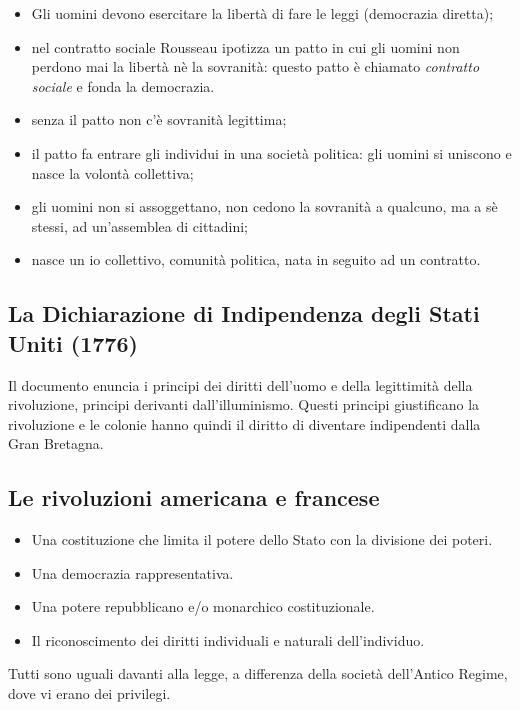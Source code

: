 \documentclass[a4paper]{article}
\begin{document}
\begin{itemize}
    \item Gli uomini devono esercitare la libertà di fare le leggi (democrazia diretta);
    \item nel contratto sociale Rousseau ipotizza un patto in cui gli uomini non perdono mai la libertà nè la sovranità: questo patto è chiamato \textit{contratto sociale} e fonda la democrazia.
    \item senza il patto non c'è sovranità legittima;
    \item il patto fa entrare gli individui in una società politica: gli uomini si uniscono e nasce la volontà collettiva;
    \item gli uomini non si assoggettano, non cedono la sovranità a qualcuno, ma a sè stessi, ad un'assemblea di cittadini;
    \item nasce un io collettivo, comunità politica, nata in seguito ad un contratto.
\end{itemize}

\subsection{La Dichiarazione di Indipendenza degli Stati Uniti (1776)}

Il documento enuncia i principi dei diritti dell'uomo e della legittimità della rivoluzione,
principi derivanti dall'illuminismo.
Questi principi giustificano la rivoluzione e le colonie hanno quindi il diritto di
diventare indipendenti dalla Gran Bretagna.


\subsection{Le rivoluzioni americana e francese}

\begin{itemize}
    \item Una costituzione che limita il potere dello Stato con la divisione dei poteri.
    \item Una democrazia rappresentativa.
    \item Una potere repubblicano e/o monarchico costituzionale.
    \item Il riconoscimento dei diritti individuali e naturali dell'individuo.
\end{itemize}

Tutti sono uguali davanti alla legge, a differenza della società dell'Antico Regime,
dove vi erano dei privilegi.
\end{document}

